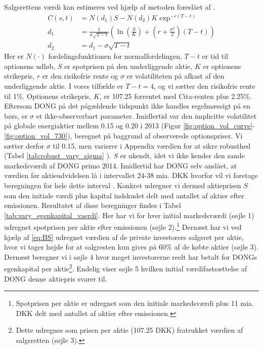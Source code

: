 \documentclass{article}
\begin{document}
Salgsrettens værdi kan estimeres ved hjælp af metoden foreslået af \cite{Black1973}. 
\begin{align}
C(s,t)&=N(d_1)S-N(d_2)K \exp^{-r(T-t)} \label{eq:BS}\\
d_1&= \frac{1}{\sigma\sqrt{T-t}}\left( \ln\left( \frac{S}{K} \right)+\left(r+\frac{\sigma^2}{2} \right)(T-t) \right) \nonumber \\
d_2&=d_1-\sigma \sqrt{T-t} \nonumber
\end{align}
Her er $N(\cdot)$ fordelingsfunktionen for normalfordelingen, $T-t$ er tid til optionens udløb, $S$ er spotprisen på den underliggende aktie, $K$ er optionens strikepris, $r$ er den risikofrie rente og $\sigma$ er volatiliteten på afkast af den underliggende aktie. I vores tilfælde er $T-t=4$, og vi sætter den risikofrie rente til 1\%. Optionens strikepris, $K$, er 107.25 forrentet med Cita-renten plus 2.25\%. Eftersom DONG på det pågældende tidspunkt ikke handles regelmæssigt på en børs, er $\sigma$ et ikke-observerbart parameter. Imidlertid var den implicitte volatilitet på globale energiaktier mellem 0.15 og 0.20 i 2013 (Figur \ref{fig:option_vol_curve}-\ref{fig:option_vol_730}), beregnet på baggrund af observerede optionspriser. Vi sætter derfor $\sigma$ til 0.15, men varierer i Appendix værdien for at sikre robusthed (Tabel \ref{tab:robust_vary_sigma} ). $S$ er ukendt, idet vi ikke kender den sande markedsværdi af DONG primo 2014. Imidlertid har DONG selv anslået, at værdien før aktieudvidelsen lå i intervallet 24-38 mia. DKK hvorfor vil vi foretage beregningen for hele dette interval \citep{DONG2015b}. Konkret udregner vi dermed aktieprisen $S$ som den initiale værdi plus kapital indskudet delt med antallet af aktier efter emissionen. 
Resultatet af disse beregninger findes i Tabel \ref{tab:vary_egenkapital_vaerdi}. Her har vi for hver initial markedsværdi (søjle 1) udregnet spotprisen per aktie efter emissionen (søjle 2).\footnote{Spotprisen per aktie er udregnet som den initiale markedsværdi plus 11 mia. DKK delt med antallet af aktier efter emissionen.} Dernæst har vi ved hjælp af \ref{eq:BS} udregnet værdien af de private investorers salgsret per aktie, hvor vi tager højde for at salgresten kun gives på 60\% af de købte aktier (søjle 3). Dernæst  beregner vi i søjle 4 hvor meget investorerne reelt har betalt for DONGs egenkapital per aktie\footnote{Dette udregnes som prisen per aktie (107.25 DKK) fratrukket værdien af salgsretten (søjle 3).}. Endelig viser søjle 5 hvilken initial værdifastsættelse af DONG denne aktiepris svarer til. 
 
\end{document}
